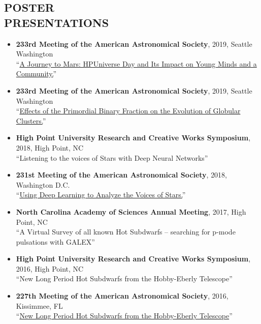 \documentclass[margin, 10pt]{res} %
\begin{document}
\begin{resume}
\section{POSTER\\PRESENTATIONS}
\begin{itemize}
\item {\scriptsize \textbf{233rd Meeting of the American Astronomical Society}}, {\small 2019, Seattle Washington}\\ ``\href{https://ui.adsabs.harvard.edu/#abs/2019AAS...23314705C/abstract}{A Journey to Mars: HPUniverse Day and Its Impact on Young Minds and a Community.}''
\item {\scriptsize \textbf{233rd Meeting of the American Astronomical Society}}, {\small 2019, Seattle Washington}\\ ``\href{https://ui.adsabs.harvard.edu/#abs/2019AAS...23324909B/abstract}{Effects of the Primordial Binary Fraction on the Evolution of Globular Clusters.}''
\item {\scriptsize \textbf{High Point University Research and Creative Works Symposium}}, {\small 2018, High Point, NC}\\ ``Listening to the voices of Stars with Deep Neural Networks''
\item \textbf{{\scriptsize 231st Meeting of the American Astronomical Society}}, {\small 2018, Washington D.C.}\\``\href{https://ui.adsabs.harvard.edu/#abs/2018AAS...23115029B/abstract}{Using Deep Learning to Analyze the Voices of Stars.}''
\item \textbf{{\scriptsize North Carolina Academy of Sciences Annual Meeting}}, {\small 2017, High Point, NC}\\ ``A Virtual Survey of all known Hot Subdwarfs -- searching for p-mode pulsations with GALEX''
\item {\scriptsize \textbf{High Point University Research and Creative Works Symposium}}, {\small 2016, High Point, NC}\\``New Long Period Hot Subdwarfs from the Hobby-Eberly Telescope''
\item \textbf{{\scriptsize 227th Meeting of the American Astronomical Society}}, {\small 2016, Kissimmee, FL}\\``\href{https://ui.adsabs.harvard.edu/#abs/2016AAS...22734412B/abstract}{New Long Period Hot Subdwarfs from the Hobby-Eberly Telescope}''
\end{itemize}


\end{resume}
\end{document}
